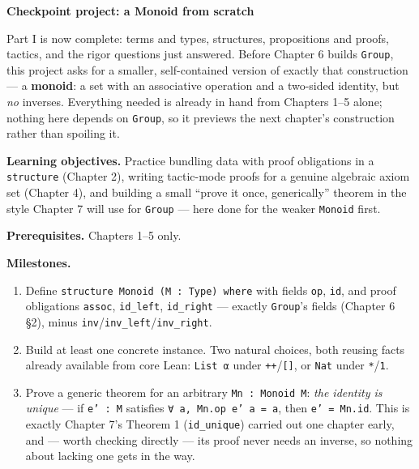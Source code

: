 \begin{pblproject}
\label{sec:05-rigor-check:06-checkpoint-project:1}
\textbf{\large Checkpoint project: a Monoid from scratch}\par\smallskip


Part I is now complete: terms and types, structures, propositions and proofs, tactics, and the rigor questions just answered. Before Chapter 6 builds \texttt{Group}, this project asks for a smaller, self-contained version of exactly that construction --- a \textbf{monoid}: a set with an associative operation and a two-sided identity, but \emph{no} inverses. Everything needed is already in hand from Chapters 1--5 alone; nothing here depends on \texttt{Group}, so it previews the next chapter's construction rather than spoiling it.

\textbf{Learning objectives.} Practice bundling data with proof obligations in a \texttt{structure} (Chapter 2), writing tactic-mode proofs for a genuine algebraic axiom set (Chapter 4), and building a small ``prove it once, generically'' theorem in the style Chapter 7 will use for \texttt{Group} --- here done for the weaker \texttt{Monoid} first.

\textbf{Prerequisites.} Chapters 1--5 only.

\textbf{Milestones.}

\begin{enumerate}
\def\labelenumi{\arabic{enumi}.}
\tightlist
\item
  Define \texttt{structure Monoid (M : Type) where} with fields \texttt{op}, \texttt{id}, and proof obligations \texttt{assoc}, \texttt{id\_\allowbreak{}left}, \texttt{id\_\allowbreak{}right} --- exactly \texttt{Group}'s fields (Chapter 6 §2), minus \texttt{inv}/\texttt{inv\_\allowbreak{}left}/\texttt{inv\_\allowbreak{}right}.
\item
  Build at least one concrete instance. Two natural choices, both reusing facts already available from core Lean: \texttt{List α} under \texttt{++}/\texttt{[]}, or \texttt{Nat} under \texttt{*}/\texttt{1}.
\item
  Prove a generic theorem for an arbitrary \texttt{Mn : Monoid M}: \emph{the identity is unique} --- if \texttt{e' : M} satisfies \texttt{∀ a, Mn.op e' a = a}, then \texttt{e' = Mn.id}. This is exactly Chapter 7's Theorem 1 (\texttt{id\_\allowbreak{}unique}) carried out one chapter early, and --- worth checking directly --- its proof never needs an inverse, so nothing about lacking one gets in the way.
\end{enumerate}


\end{pblproject}
